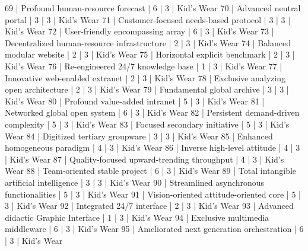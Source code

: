 \begin{enumerate}
\begin{pseudo*}
      69 | Profound human-resource forecast                 |        6 |      3 | Kid's Wear    
      70 | Advanced neutral portal                          |        3 |      3 | Kid's Wear    
      71 | Customer-focused needs-based protocol            |        3 |      3 | Kid's Wear    
      72 | User-friendly encompassing array                 |        6 |      3 | Kid's Wear    
      73 | Decentralized human-resource infrastructure      |        2 |      3 | Kid's Wear    
      74 | Balanced modular website                         |        2 |      3 | Kid's Wear    
      75 | Horizontal explicit benchmark                    |        2 |      3 | Kid's Wear    
      76 | Re-engineered 24/7 knowledge base                |        1 |      3 | Kid's Wear    
      77 | Innovative web-enabled extranet                  |        2 |      3 | Kid's Wear    
      78 | Exclusive analyzing open architecture            |        2 |      3 | Kid's Wear    
      79 | Fundamental global archive                       |        3 |      3 | Kid's Wear    
      80 | Profound value-added intranet                    |        5 |      3 | Kid's Wear    
      81 | Networked global open system                     |        6 |      3 | Kid's Wear    
      82 | Persistent demand-driven complexity              |        5 |      3 | Kid's Wear    
      83 | Focused secondary initiative                     |        5 |      3 | Kid's Wear    
      84 | Digitized tertiary groupware                     |        3 |      3 | Kid's Wear    
      85 | Enhanced homogeneous paradigm                    |        4 |      3 | Kid's Wear    
      86 | Inverse high-level attitude                      |        4 |      3 | Kid's Wear    
      87 | Quality-focused upward-trending throughput       |        4 |      3 | Kid's Wear    
      88 | Team-oriented stable project                     |        6 |      3 | Kid's Wear    
      89 | Total intangible artificial intelligence         |        3 |      3 | Kid's Wear    
      90 | Streamlined asynchronous functionalities         |        5 |      3 | Kid's Wear    
      91 | Vision-oriented attitude-oriented core           |        5 |      3 | Kid's Wear    
      92 | Integrated 24/7 interface                        |        2 |      3 | Kid's Wear    
      93 | Advanced didactic Graphic Interface              |        1 |      3 | Kid's Wear    
      94 | Exclusive multimedia middleware                  |        6 |      3 | Kid's Wear    
      95 | Ameliorated next generation orchestration        |        6 |      3 | Kid's Wear    

\end{pseudo*}
\end{enumerate}

